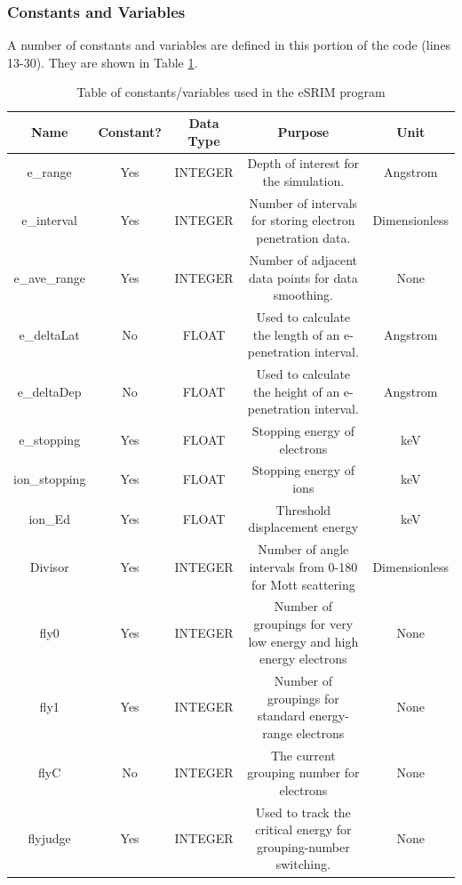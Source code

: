 \documentclass[10pt, reqno]{exam}
\begin{document}
\clearpage

\subsubsection{Constants and Variables} 
A number of constants and variables are defined in this portion of the code (lines 13-30). They are shown in Table \ref{tbl:constants_and_variables}. \par

{    
    \scriptsize
    \begin{longtable}{|c|c|c|c|c|}
        \caption{Table of constants/variables used in the eSRIM program}
        \label{tbl:constants_and_variables} \\
        \hline
        Name & Constant? & Data Type & Purpose & Unit \\
        \hline
        e\_range & Yes & INTEGER & Depth of interest for the simulation. & Angstrom \\
        e\_interval & Yes & INTEGER & Number of intervals for storing electron penetration data. & Dimensionless \\
        e\_ave\_range & Yes & INTEGER & Number of adjacent data points for data smoothing. & None \\
        e\_deltaLat & No & FLOAT & Used to calculate the length of an e-penetration interval. & Angstrom \\
        e\_deltaDep & No & FLOAT & Used to calculate the height of an e-penetration interval. & Angstrom \\
        e\_stopping & Yes & FLOAT & Stopping energy of electrons & keV \\
        ion\_stopping & Yes & FLOAT & Stopping energy of ions & keV \\
        ion\_Ed & Yes & FLOAT & Threshold displacement energy & keV \\
        Divisor & Yes & INTEGER & Number of angle intervals from 0-180 for Mott scattering & Dimensionless \\
        fly0 & Yes & INTEGER & Number of groupings for very low energy and high energy electrons & None \\
        fly1 & Yes & INTEGER & Number of groupings for standard energy-range electrons & None \\
        flyC & No & INTEGER & The current grouping number for electrons & None \\
        flyjudge & Yes & INTEGER & Used to track the critical energy for grouping-number switching. & None \\

\end{longtable}}
\end{document}
